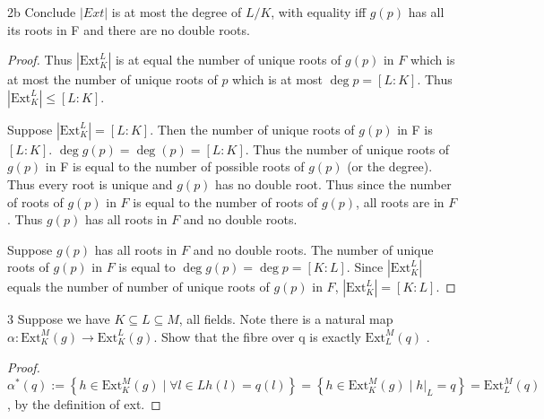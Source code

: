 \documentclass{article}
\newcommand{\ext}[2]{\text{Ext}_{#1}^{#2}}
\begin{document}
\begin{PROB}{2b}\label{Problem 2b.}
    Conclude $|Ext|$ is at most the degree of $L / K$, with equality iff $g(p)$ has all its roots in F and there are no double roots.
\end{PROB}
\begin{proof}
    Thus $|\ext{K}{L}|$ is at equal the number of unique roots of $g(p)$ in $F$ which is at most the number of unique roots of $p$ which is at most $\deg p = [L : K]$. Thus $|\ext{K}{L}| \leq [L : K]$.

    Suppose $|\ext{K}{L}| = [L : K]$. Then the number of unique roots of $g(p)$ in F is $[L : K]$. $\deg g(p) = \deg(p) = [L : K]$. Thus the number of unique roots of $g(p)$ in F is equal to the number of possible roots of $g(p)$ (or the degree). Thus every root is unique and $g(p)$ has no double root. Thus since the number of roots of $g(p)$ in $F$ is equal to the number of roots of $g(p)$, all roots are in $F$. Thus $g(p)$ has all roots in $F$ and no double roots. 
    
    Suppose $g(p)$ has all roots in $F$ and no double roots. The number of unique roots of $g(p)$ in $F$ is equal to $\deg g(p) = \deg p = [K : L]$. Since $|\ext{K}{L}|$ equals the number of number of unique roots of $g(p)$ in $F$, $|\ext{K}{L}| = [K : L]$.        
\end{proof}

\bigskip

\begin{PROB}{3}\label{Problem 3.}
    Suppose we have $K \subseteq L \subseteq M$, all fields.  Note there is a natural map $\alpha: \ext{K}{M}(g) \to \ext{K}{L}(g)$. Show that the fibre over q is exactly $\ext{L}{M}(q)$ . 
\end{PROB}
\begin{proof}
    $\alpha^*(q) := \left\{ h \in \ext{K}{M}(g) \mid \forall l \in L h(l) = q(l) \right\} = \left\{ h \in \ext{K}{M}(g) \mid h|_L = q \right\} = \ext{L}{M}(q)$, by the definition of ext.
\end{proof}

\bigskip
\end{document}
